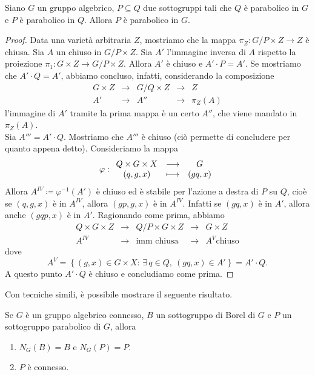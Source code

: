 \begin{lemma}\label{LmSottogruppoParabolicoDiParabolicoEParabolico}
    Siano $G$ un gruppo algebrico, $P\subseteq Q$ due sottogruppi tali che $Q$ è parabolico in $G$ e $P$ è parabolico in $Q$. Allora $P$ è parabolico in $G$.
\end{lemma}

\begin{proof}
    Data una varietà arbitraria $Z$, mostriamo che la mappa $\pi_Z\colon G/P\times Z \to Z$ è chiusa. Sia $A$ un chiuso in $G/P\times Z$. Sia $A'$ l'immagine inversa di $A$ rispetto la proiezione $\pi_1\colon G\times Z \to G/P\times Z$. Allora $A'$ è chiuso e $A' \cdot P=A'$. Se mostriamo che $A'\cdot Q=A'$, abbiamo concluso, infatti, considerando la composizione \[\begin{array}{ccccc}
         G\times Z &\xrightarrow{}& G/Q \times Z& \to &Z \\
          A' & \to & A'' & \to & \pi_Z(A) 
    \end{array}\] 
    l'immagine di $A'$ tramite la prima mappa è un certo $A''$, che viene mandato in $\pi_Z(A)$. \\
    Sia $A'''=A'\cdot Q$. Mostriamo che $A'''$ è chiuso (ciò permette di concludere per quanto appena detto). Consideriamo la mappa 
	\[\varphi:\begin{array}{ccc} {Q\times G\times X} & \longrightarrow & {G}\\ {(q,g,x)} & \longmapsto & {(gq,x)} \end{array}\] 
    Allora $A^{IV}\coloneqq \varphi^{-1}(A')$ è chiuso ed è stabile per l'azione a destra di $P$ su $Q$, cioè se $(q,g,x)$ è in $A^{IV}$, allora $(gp,g,x)$ è in $A^{IV}$. Infatti se $(gq,x)$ è in $A'$, allora anche $(gqp,x)$ è in $A'$. Ragionando come prima, abbiamo 
	\[\begin{array}{ccccc}
         Q\times G\times Z &\xrightarrow{}& Q/P \times G \times Z& \to &G\times Z \\
          A^{IV} & \to & \text{imm chiusa} & \to & A^V \text{chiuso} 
    \end{array}\] 
    dove 
	\[A^V=\left\{(g,x)\in G\times X \colon \, \exists\,q\in Q, \ (gq,x)\in A'\right\}=A'\cdot Q.\] 
	A questo punto $A' \cdot Q$ è chiuso e concludiamo come prima.
\end{proof}

Con tecniche simili, è possibile mostrare il seguente risultato.

\begin{theorem}\label{ThNormalizzatoreDiBorelEDiParabolico}
    Se $G$ è un gruppo algebrico connesso, $B$ un sottogruppo di Borel di $G$ e $P$ un sottogruppo parabolico di $G$, allora \begin{enumerate}
        \item $N_G(B)=B$ e $N_G(P)=P$.
        \item $P$ è connesso.
    \end{enumerate}
\end{theorem}

